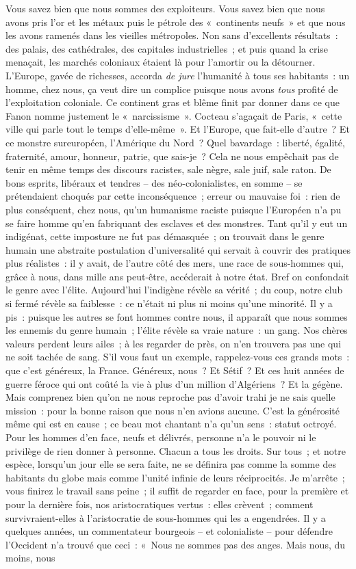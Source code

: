 \documentclass[french,twoside]{book} %
\begin{document}
Vous savez bien que nous sommes des exploiteurs. Vous savez bien que nous avons pris l’or et les métaux puis le pétrole des « continents neufs » et que nous les avons ramenés dans les vieilles métropoles. Non sans d’excellents résultats : des palais, des cathédrales, des capitales industrielles ; et puis quand la crise menaçait, les marchés coloniaux étaient là pour l’amortir ou la détourner. L’Europe, gavée de richesses, accorda \emph{de jure} l’humanité à tous ses habitants : un homme, chez nous, ça veut dire un complice puisque nous avons \emph{tous} profité de l’exploitation coloniale. Ce continent gras et blême finit par donner dans ce que Fanon nomme justement le « narcissisme ». Cocteau s’agaçait de Paris, « cette ville qui parle tout le temps d’elle-même ». Et l’Europe, que fait-elle d’autre ? Et ce monstre sureuropéen, l’Amérique du Nord ? Quel bavardage : liberté, égalité, fraternité, amour, honneur, patrie, que sais-je ? Cela ne nous empêchait pas de tenir en même temps des discours racistes, sale nègre, sale juif, sale raton. De bons esprits, libéraux et tendres – des néo-colonialistes, en somme – se prétendaient choqués par cette inconséquence ; erreur ou mauvaise foi : rien de plus conséquent, chez nous, qu’un humanisme raciste puisque l’Européen n’a pu se faire homme qu’en fabriquant des esclaves et des monstres. Tant qu’il y eut un indigénat, cette imposture ne fut pas démasquée ; on trouvait dans le genre humain une abstraite postulation d’universalité qui servait à couvrir des pratiques plus réalistes : il y avait, de l’autre côté des mers, une race de sous-hommes qui, grâce à nous, dans mille ans peut-être, accéderait à notre état. Bref on confondait le   genre avec l’élite. Aujourd’hui l’indigène révèle sa vérité ; du coup, notre club si fermé révèle sa faiblesse : ce n’était ni plus ni moins qu’une minorité. Il y a pis : puisque les autres se font hommes contre nous, il apparaît que nous sommes les ennemis du genre humain ; l’élite révèle sa vraie nature : un gang. Nos chères valeurs perdent leurs ailes ; à les regarder de près, on n’en trouvera pas une qui ne soit tachée de sang. S’il vous faut un exemple, rappelez-vous ces grands mots : que c’est généreux, la France. Généreux, nous ? Et Sétif ? Et ces huit années de guerre féroce qui ont coûté la vie à plus d’un million d’Algériens ? Et la gégène. Mais comprenez bien qu’on ne nous reproche pas d’avoir trahi je ne sais quelle mission : pour la bonne raison que nous n’en avions aucune. C’est la générosité même qui est en cause ; ce beau mot chantant n’a qu’un sens : statut octroyé. Pour les hommes d’en face, neufs et délivrés, personne n’a le pouvoir ni le privilège de rien donner à personne. Chacun a tous les droits. Sur tous ; et notre espèce, lorsqu’un jour elle se sera faite, ne se définira pas comme la somme des habitants du globe mais comme l’unité infinie de leurs réciprocités. Je m’arrête ; vous finirez le travail sans peine ; il suffit de regarder en face, pour la première et pour la dernière fois, nos aristocratiques vertus : elles crèvent ; comment survivraient-elles à l’aristocratie de sous-hommes qui les a engendrées. Il y a quelques années, un commentateur bourgeois – et colonialiste – pour défendre l’Occident n’a trouvé que ceci : « Nous ne sommes pas des anges. Mais nous, du moins, nous 
\end{document}
